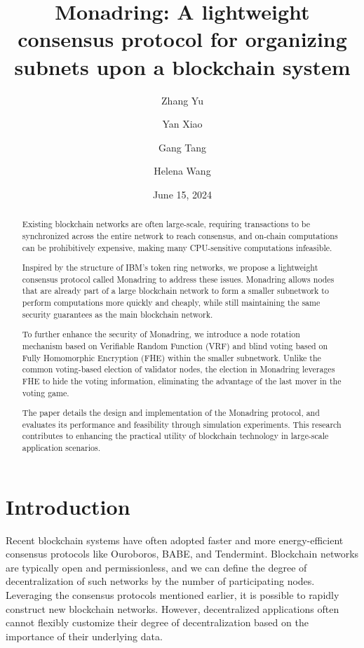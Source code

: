 \documentclass[11pt]{article}
\begin{document}
\title{Monadring: A lightweight consensus protocol for organizing subnets upon a blockchain system}
\author[*]{Zhang Yu}
\author[*]{Yan Xiao}
\author[*]{Gang Tang}
\author[*]{Helena Wang}
\date{June 15, 2024}
\maketitle

\begin{abstract}
Existing blockchain networks are often large-scale, requiring transactions to be synchronized across the entire network to reach consensus, and on-chain computations can be prohibitively expensive, making many CPU-sensitive computations infeasible.

Inspired by the structure of IBM's token ring networks, we propose a lightweight consensus protocol called Monadring to address these issues. Monadring allows nodes that are already part of a large blockchain network to form a smaller subnetwork to perform computations more quickly and cheaply, while still maintaining the same security guarantees as the main blockchain network.

To further enhance the security of Monadring, we introduce a node rotation mechanism based on Verifiable Random Function (VRF) and blind voting based on Fully Homomorphic Encryption (FHE) within the smaller subnetwork. Unlike the common voting-based election of validator nodes, the election in Monadring leverages FHE to hide the voting information, eliminating the advantage of the last mover in the voting game.

The paper details the design and implementation of the Monadring protocol, and evaluates its performance and feasibility through simulation experiments. This research contributes to enhancing the practical utility of blockchain technology in large-scale application scenarios.
\end{abstract}

\section{Introduction}
Recent blockchain systems have often adopted faster and more energy-efficient consensus protocols like Ouroboros, BABE, and Tendermint.
Blockchain networks are typically open and permissionless, and we can define the degree of decentralization of such networks by the number of participating nodes.
Leveraging the consensus protocols mentioned earlier, it is possible to rapidly construct new blockchain networks.
However, decentralized applications often cannot flexibly customize their degree of decentralization based on the importance of their underlying data.
\end{document}
